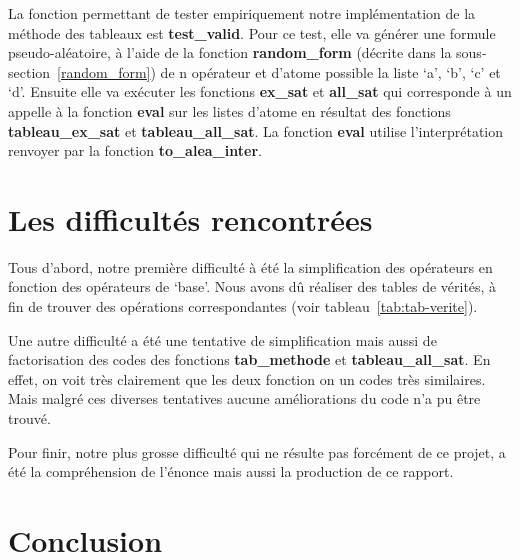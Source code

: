 \documentclass[12pt]{article}
\begin{document}
    La fonction permettant de tester empiriquement notre implémentation de la 
    méthode des tableaux est \textbf{test\_valid}. Pour ce test, elle va 
    générer une formule pseudo-aléatoire, à l'aide de la fonction \textbf{random\_form}
    (décrite dans la sous-section~\ref{random_form}) de n opérateur et d'atome 
    possible la liste `a', `b', `c' et `d'. Ensuite elle va exécuter les fonctions 
    \textbf{ex\_sat} et \textbf{all\_sat} qui corresponde à un appelle à la fonction 
    \textbf{eval} sur les listes d'atome en résultat des fonctions 
    \textbf{tableau\_ex\_sat} et \textbf{tableau\_all\_sat}. La fonction 
    \textbf{eval} utilise l'interprétation renvoyer par la fonction 
    \textbf{to\_alea\_inter}.

    \section{Les difficultés rencontrées}

    Tous d'abord, notre première difficulté à été la simplification des 
    opérateurs en fonction des opérateurs de `base'. Nous avons dû réaliser des
    tables de vérités, à fin de trouver des opérations correspondantes (voir 
    tableau~\ref{tab:tab-verite}).

    Une autre difficulté a été une tentative de simplification mais aussi de 
    factorisation des codes des fonctions \textbf{tab\_methode} et 
    \textbf{tableau\_all\_sat}. En effet, on voit très clairement que les deux 
    fonction on un codes très similaires. Mais malgré ces diverses tentatives 
    aucune améliorations du code n'a pu être trouvé.  

    Pour finir, notre plus grosse difficulté qui ne résulte pas forcément de ce 
    projet, a été la compréhension de l'énonce mais aussi la production de ce 
    rapport.
    
    \section{Conclusion}

    
\end{document}

